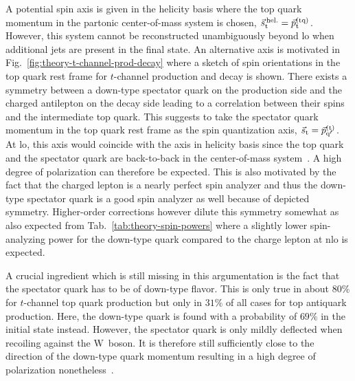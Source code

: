 A potential spin axis is given in the helicity basis where the top quark momentum in the partonic center-of-mass system is chosen, $\vec{s}_\mathrm{t}^\scriptn{\,\mathrm{hel.}}=\vec{p}_\mathrm{t}^\scriptn{\mathrm{(tq)}}$. However, this system cannot be reconstructed unambiguously beyond \gls{lo} when additional jets are present in the final state. An alternative axis is motivated in Fig.~\ref{fig:theory-t-channel-prod-decay} where a sketch of spin orientations in the top quark rest frame for $t$-channel production and decay is shown. There exists a symmetry between a down-type spectator quark on the production side and the charged antilepton on the decay side leading to a correlation between their spins and the intermediate top quark. This suggests to take the spectator quark momentum in the top quark rest frame as the spin quantization axis, $\vec{s}_\mathrm{t}=\vec{p}_{\mathrm{q}^\prime}^\scriptn{\mathrm{(t)}}$. At \gls{lo}, this axis would coincide with the axis in helicity basis since the top quark and the spectator quark are back-to-back in the center-of-mass system~\cite{Schwienhorst:2010je}. A high degree of polarization can therefore be expected. This is also motivated by the fact that the charged lepton is a nearly perfect spin analyzer and thus the down-type spectator quark is a good spin analyzer as well because of depicted symmetry. Higher-order corrections however dilute this symmetry somewhat as also expected from Tab.~\ref{tab:theory-spin-powers} where a slightly lower spin-analyzing power for the down-type quark compared to the charge lepton at \gls{nlo} is expected. 


A crucial ingredient which is still missing in this argumentation is the fact that the spectator quark has to be of down-type flavor. This is only true in about $80\%$ for $t$-channel top quark production but only in $31\%$ of all cases for top antiquark production. Here, the down-type quark is found with a probability of $69\%$ in the initial state instead. However, the spectator quark is only mildly deflected when recoiling against the $\mathrm{W}$~boson. It is therefore still sufficiently close to the direction of the down-type quark momentum resulting in a high degree of polarization nonetheless~\cite{Bernreuther:2008ju}.

